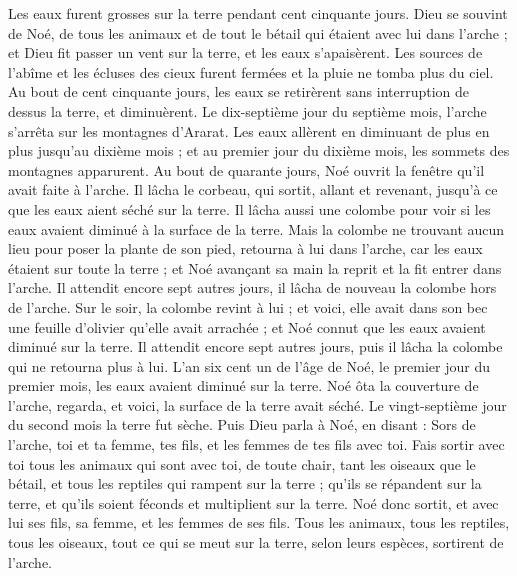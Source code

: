 \begin{multicols}{2}
Les eaux furent grosses sur la terre pendant cent cinquante jours.
\VerseOne{}Dieu se souvint de Noé, de tous les animaux et de tout le bétail qui étaient avec lui dans l'arche ; et Dieu fit passer un vent sur la terre, et les eaux s’apaisèrent.
Les sources de l'abîme et les écluses des cieux furent fermées et la pluie ne tomba plus du ciel.
Au bout de cent cinquante jours, les eaux se retirèrent sans interruption de dessus la terre, et diminuèrent.
Le dix-septième jour du septième mois, l'arche s'arrêta sur les montagnes d'Ararat.
Les eaux allèrent en diminuant de plus en plus jusqu'au dixième mois ; et au premier jour du dixième mois, les sommets des montagnes apparurent.
Au bout de quarante jours, Noé ouvrit la fenêtre qu’il avait faite à l'arche.
Il lâcha le corbeau, qui sortit, allant et revenant, jusqu'à ce que les eaux aient séché sur la terre.
Il lâcha aussi une colombe pour voir si les eaux avaient diminué à la surface de la terre.
Mais la colombe ne trouvant aucun lieu pour poser la plante de son pied, retourna à lui dans l'arche, car les eaux étaient sur toute la terre ; et Noé avançant sa main la reprit et la fit entrer dans l'arche.
Il attendit encore sept autres jours, il lâcha de nouveau la colombe hors de l'arche.
Sur le soir, la colombe revint à lui ; et voici, elle avait dans son bec une feuille d'olivier qu'elle avait arrachée ; et Noé connut que les eaux avaient diminué sur la terre.
Il attendit encore sept autres jours, puis il lâcha la colombe qui ne retourna plus à lui.
L’an six cent un de l'âge de Noé, le premier jour du premier mois, les eaux avaient diminué sur la terre. Noé ôta la couverture de l'arche, regarda, et voici, la surface de la terre avait séché.
Le vingt-septième jour du second mois la terre fut sèche.
Puis Dieu parla à Noé, en disant :
Sors de l'arche, toi et ta femme, tes fils, et les femmes de tes fils avec toi.
Fais sortir avec toi tous les animaux qui sont avec toi, de toute chair, tant les oiseaux que le bétail, et tous les reptiles qui rampent sur la terre ; qu'ils se répandent sur la terre, et qu'ils soient féconds et multiplient sur la terre.
Noé donc sortit, et avec lui ses fils, sa femme, et les femmes de ses fils.
Tous les animaux, tous les reptiles, tous les oiseaux, tout ce qui se meut sur la terre, selon leurs espèces, sortirent de l'arche.

\end{multicols}
